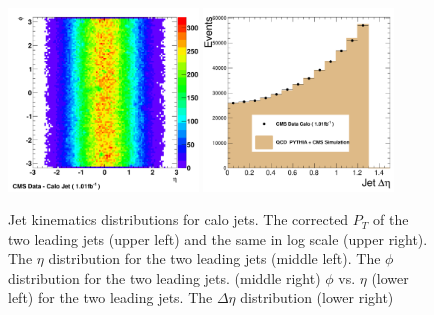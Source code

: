 \begin{figure}[!ht]
\begin{center}
    \includegraphics[width=0.45\textwidth]{Figures/c_Eta_Phi_Scatter.pdf}
    \includegraphics[width=0.45\textwidth]{Figures/c_DEta.pdf}

    \caption{ Jet kinematics distributions for calo jets.  The corrected $P_T$ of
      the two leading jets (upper left) and the same in log scale
      (upper right). The $\eta$ distribution for the two leading jets
      (middle left). The $\phi$ distribution for the two leading
      jets. (middle right) $\phi$ vs. $\eta$ (lower left) for the two
      leading jets. The $\Delta\eta$ distribution (lower right) }
    \label{jet_kinematics_calo}
  \end{center}
\end{figure}

